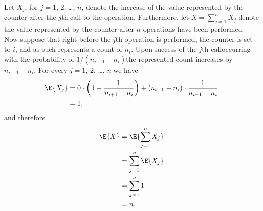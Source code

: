 Let $X_j$, for $j=1$, 2, \dots, $n$, denote the increase of the value represented by the counter after the $j$th call to the  operation.
Furthermore, let $X=\sum_{j=1}^nX_j$ denote the value represented by the counter after $n$  operations have been performed.
Now suppose that right before the $j$th  operation is performed, the counter is set to $i$, and as such represents a count of $n_i$.
Upon success of the $j$th call\dash occurring with the probability of $1/(n_{i+1}-n_i)$\dash the represented count increases by $n_{i+1}-n_i$.
For every $j=1$, 2, \dots, $n$ we have
\begin{align*}
    \E{X_j} &= 0\cdot\left(1-\frac{1}{n_{i+1}-n_i}\right)+(n_{i+1}-n_i)\cdot\frac{1}{n_{i+1}-n_i} \\
    &= 1,
\end{align*}
and therefore
\begin{align*}
    \E{X} &= \E{\sum_{j=1}^nX_j} \\
    &= \sum_{j=1}^n\E{X_j} \\
    &= \sum_{j=1}^n1 \\
    &= n.
\end{align*}
